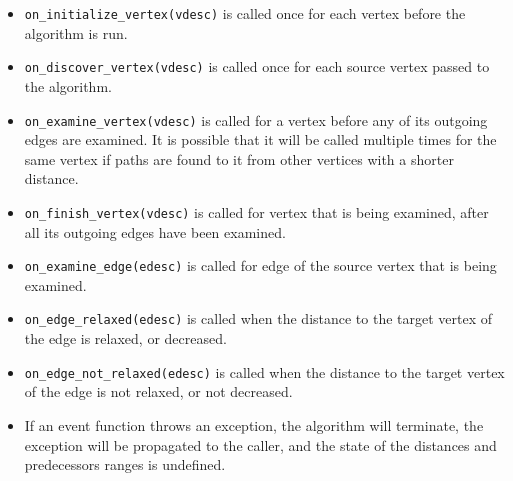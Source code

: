 {\small
      
}
\begin{itemdescr}
      \pnum\effects
            \begin{itemize}
                  \item
                        \lstinline{on_initialize_vertex(vdesc)} is called once for each vertex before
                        the algorithm is run.
                  \item
                        \lstinline{on_discover_vertex(vdesc)} is called once for each source vertex passed
                        to the algorithm.
                  \item
                        \lstinline{on_examine_vertex(vdesc)} is called for a vertex before any of 
                        its outgoing edges are examined. It is possible that it will be called multiple times 
                        for the same vertex if paths are found to it from other vertices with a shorter distance.
                  \item
                        \lstinline{on_finish_vertex(vdesc)} is called for vertex that is being examined,
                        after all its outgoing edges have been examined.
                  \item
                        \lstinline{on_examine_edge(edesc)} is called for edge of the source vertex that is
                        being examined.
                  \item
                        \lstinline{on_edge_relaxed(edesc)} is called when the distance to the target vertex of the edge
                        is relaxed, or decreased.
                  \item
                        \lstinline{on_edge_not_relaxed(edesc)} is called when the distance to the target vertex of the edge
                        is not relaxed, or not decreased.
            \end{itemize}
      \pnum\throws 
            \begin{itemize}
                  \item If an event function throws an exception, the algorithm will terminate, the exception will 
                  be propagated to the caller, and the state of the distances and predecessors ranges is undefined.
            \end{itemize}
\end{itemdescr}

